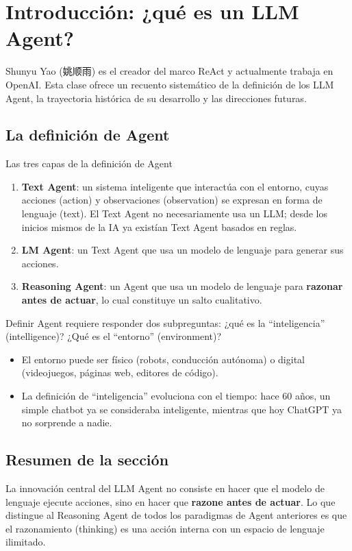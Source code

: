 \section{Introducción: ¿qué es un LLM Agent?}

Shunyu Yao (姚顺雨) es el creador del marco ReAct y actualmente trabaja en OpenAI. Esta clase ofrece un recuento sistemático de la definición de los LLM Agent, la trayectoria histórica de su desarrollo y las direcciones futuras.

\subsection{La definición de Agent}

\begin{importantbox}{Las tres capas de la definición de Agent}
\begin{enumerate}
    \item \textbf{Text Agent}: un sistema inteligente que interactúa con el entorno, cuyas acciones (action) y observaciones (observation) se expresan en forma de lenguaje (text). El Text Agent no necesariamente usa un LLM; desde los inicios mismos de la IA ya existían Text Agent basados en reglas.
    \item \textbf{LM Agent}: un Text Agent que usa un modelo de lenguaje para generar sus acciones.
    \item \textbf{Reasoning Agent}: un Agent que usa un modelo de lenguaje para \textbf{razonar antes de actuar}, lo cual constituye un salto cualitativo.
\end{enumerate}
\end{importantbox}

Definir Agent requiere responder dos subpreguntas: ¿qué es la ``inteligencia'' (intelligence)? ¿Qué es el ``entorno'' (environment)?

\begin{itemize}
    \item El entorno puede ser físico (robots, conducción autónoma) o digital (videojuegos, páginas web, editores de código).
    \item La definición de ``inteligencia'' evoluciona con el tiempo: hace 60 años, un simple chatbot ya se consideraba inteligente, mientras que hoy ChatGPT ya no sorprende a nadie.
\end{itemize}

\subsection{Resumen de la sección}

La innovación central del LLM Agent no consiste en hacer que el modelo de lenguaje ejecute acciones, sino en hacer que \textbf{razone antes de actuar}. Lo que distingue al Reasoning Agent de todos los paradigmas de Agent anteriores es que el razonamiento (thinking) es una acción interna con un espacio de lenguaje ilimitado.
